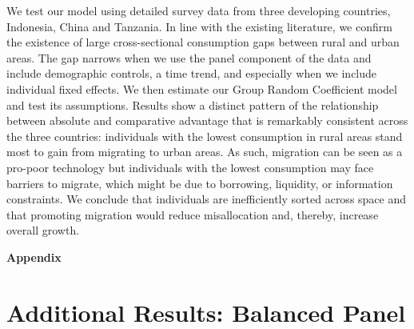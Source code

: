 \documentclass[12pt]{article}
\begin{document}
We test our model using detailed survey data from three developing countries, Indonesia, China and Tanzania. In line with the existing literature, we confirm the existence of large cross-sectional consumption gaps between rural and urban areas. The gap narrows when we use the panel component of the data and include demographic controls, a time trend, and especially when we include individual fixed effects. 
We then estimate our Group Random Coefficient model and test its assumptions. 
Results show a distinct pattern of the relationship between absolute and comparative advantage that is remarkably consistent across the three countries: individuals with the lowest consumption in rural areas stand most to gain from migrating to urban areas. 
As such, migration can be seen as a pro-poor technology but individuals with the lowest consumption may face barriers to migrate, which might be due to borrowing, liquidity, or information constraints. 
We conclude that individuals are inefficiently sorted across space and that promoting migration would reduce misallocation and, thereby, increase overall growth. 

\newpage
% 


\newpage
\appendix
\onehalfspacing


\renewcommand\thefigure{\thesection.\arabic{figure}}
\setcounter{figure}{0}
\renewcommand\theassumption{\thesection.\arabic{assumption}}
\setcounter{assumption}{0}
\renewcommand\theproposition{\thesection.\arabic{proposition}}
\setcounter{proposition}{0}
\renewcommand\thelemma{\thesection.\arabic{lemma}}
\setcounter{lemma}{0}

\renewcommand\thetable{\thesection.\arabic{table}}
\setcounter{table}{0}
\begin{center}\textbf{\huge{Appendix}}\end{center}


\section{Additional Results: Balanced Panel}\label{app:balanced_panel}
\end{document}
